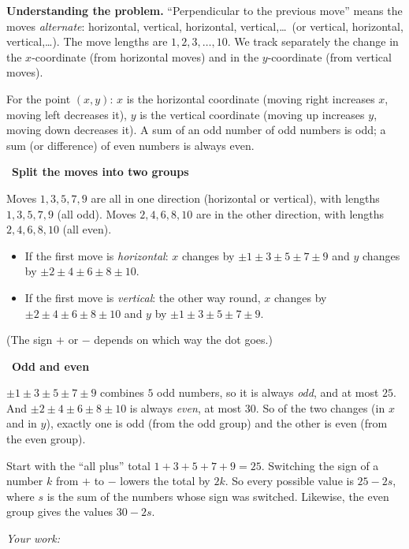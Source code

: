 \documentclass[11pt]{article}
\newif\ifsol \solfalse
\newcommand{\StuProb}[2]{\begin{probboxS}{#1}{#2}\StuProbBody\end{probboxS}}
\newcommand{\probsol}[1]{%
  \begin{lrbox}{\solmeasure}\begin{minipage}{\dimexpr\linewidth-24pt\relax}#1\end{minipage}\end{lrbox}%
  \ifsol
    \begin{solbox}#1\end{solbox}%
  \else
    \setlength{\solht}{\dimexpr\ht\solmeasure+\dp\solmeasure+0.85cm\relax}%
    \ifdim\solht<1.35cm\setlength{\solht}{1.35cm}\fi
    \ifdim\solht>\StudentMaxWork\setlength{\solht}{\StudentMaxWork}\fi
    \par\noindent\begin{minipage}{\linewidth}%
    \expandafter\StuProb\StuProbArgs
    \begin{tcolorbox}[colback=white,colframe=Line,boxrule=0.8pt,arc=5pt,
      left=8pt,right=8pt,top=4pt,bottom=4pt,height=\solht]{\footnotesize\color{Slate}\itshape\WorkWord}\end{tcolorbox}%
    \end{minipage}\par\medskip
  \fi}
\newlength{\StudentMaxWork}\setlength{\StudentMaxWork}{4.5cm}
\newcommand{\step}[2]{\par\smallskip\noindent{\bfseries\color{tmBlue!85!black}\StepWord~#1.}\ {\bfseries #2}\par\nopagebreak}
\def\WorkWord{Your work:}
\def\StepWord{Step}
\begin{document}
\probsol{
\textbf{Understanding the problem.} ``Perpendicular to the previous move'' means the moves \emph{alternate}: horizontal, vertical, horizontal, vertical,\dots\ (or vertical, horizontal, vertical,\dots). The move lengths are $1,2,3,\dots,10$. We track separately the change in the $x$-coordinate (from horizontal moves) and in the $y$-coordinate (from vertical moves).

\begin{recallbox}For the point $(x,y)$: $x$ is the horizontal coordinate (moving right increases $x$, moving left decreases it), $y$ is the vertical coordinate (moving up increases $y$, moving down decreases it). A sum of an odd number of odd numbers is odd; a sum (or difference) of even numbers is always even.\end{recallbox}

\step{1}{Split the moves into two groups}
Moves $1,3,5,7,9$ are all in one direction (horizontal or vertical), with lengths $1,3,5,7,9$ (all odd). Moves $2,4,6,8,10$ are in the other direction, with lengths $2,4,6,8,10$ (all even).
\begin{itemize}[leftmargin=1.4em,itemsep=1pt]
\item If the first move is \emph{horizontal}: $x$ changes by $\pm1\pm3\pm5\pm7\pm9$ and $y$ changes by $\pm2\pm4\pm6\pm8\pm10$.
\item If the first move is \emph{vertical}: the other way round, $x$ changes by $\pm2\pm4\pm6\pm8\pm10$ and $y$ by $\pm1\pm3\pm5\pm7\pm9$.
\end{itemize}
(The sign $+$ or $-$ depends on which way the dot goes.)

\step{2}{Odd and even}
$\pm1\pm3\pm5\pm7\pm9$ combines $5$ odd numbers, so it is always \emph{odd}, and at most $25$. And $\pm2\pm4\pm6\pm8\pm10$ is always \emph{even}, at most $30$. So of the two changes (in $x$ and in $y$), exactly one is odd (from the odd group) and the other is even (from the even group).

\begin{proofbox}Start with the ``all plus'' total $1+3+5+7+9=25$. Switching the sign of a number $k$ from $+$ to $-$ lowers the total by $2k$. So every possible value is $25-2s$, where $s$ is the sum of the numbers whose sign was switched. Likewise, the even group gives the values $30-2s$.\end{proofbox}

}
\end{document}
